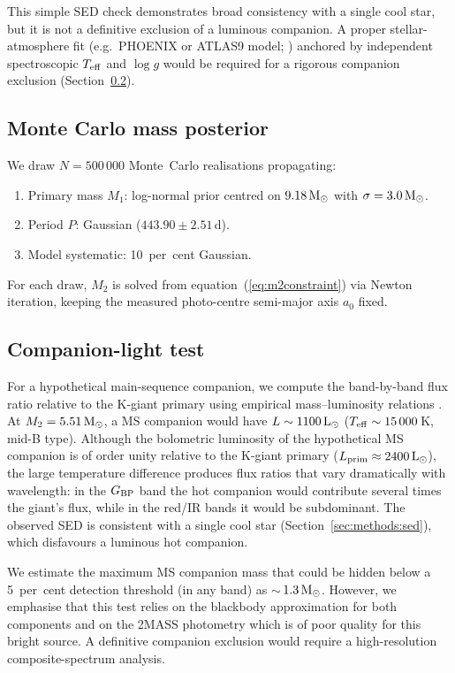 \documentclass[usenatbib,fleqn]{mnras}
\newcommand{\Msun}{{\rm M}_\odot}
\newcommand{\Lsun}{{\rm L}_\odot}
\begin{document}
This simple SED check demonstrates broad consistency with a
single cool star, but it is not a definitive exclusion of
a luminous companion.  A proper stellar-atmosphere fit (e.g.\
PHOENIX or ATLAS9 model; \citealt{Husser2013, Castelli2003})
anchored by independent spectroscopic $T_{\rm eff}$ and $\log g$
would be required for a rigorous companion exclusion
(Section~\ref{sec:methods:companion}).

\subsection{Monte Carlo mass posterior}
\label{sec:methods:mc}

We draw $N = 500\,000$ Monte~Carlo realisations propagating:
\begin{enumerate}
\item Primary mass $M_1$: log-normal prior centred on
  $9.18\,\Msun$ with $\sigma = 3.0\,\Msun$.
\item Period $P$: Gaussian ($443.90 \pm 2.51$\,d).
\item Model systematic: 10~per~cent Gaussian.
\end{enumerate}
For each draw, $M_2$ is solved from
equation~(\ref{eq:m2constraint}) via Newton iteration, keeping the
measured photo-centre semi-major axis $a_0$ fixed.

\subsection{Companion-light test}
\label{sec:methods:companion}

For a hypothetical main-sequence companion, we compute the
band-by-band flux ratio relative to the K-giant primary using
empirical mass--luminosity relations \citep{Eker2018}.  At
$M_2 = 5.51\,\Msun$, a MS companion would have
$L \sim 1100\,\Lsun$ ($T_{\rm eff} \sim 15\,000$\,K, mid-B type).
Although the bolometric luminosity of the hypothetical MS companion
is of order unity relative to the K-giant primary
($L_{\rm prim} \approx 2400\,\Lsun$), the large temperature
difference produces flux ratios that vary dramatically with
wavelength: in the $G_{\rm BP}$ band the hot companion would
contribute several times the giant's flux, while in the red/IR
bands it would be subdominant.  The observed SED is consistent
with a single cool star (Section~\ref{sec:methods:sed}), which
disfavours a luminous hot companion.

We estimate the maximum MS companion mass that could be hidden
below a 5~per~cent detection threshold (in any band) as
$\sim$\,$1.3\,\Msun$.  However, we emphasise that this test
relies on the blackbody approximation for both components and on
the 2MASS photometry which is of poor quality for this bright
source.  A definitive companion exclusion would require a
high-resolution composite-spectrum analysis.
\end{document}
